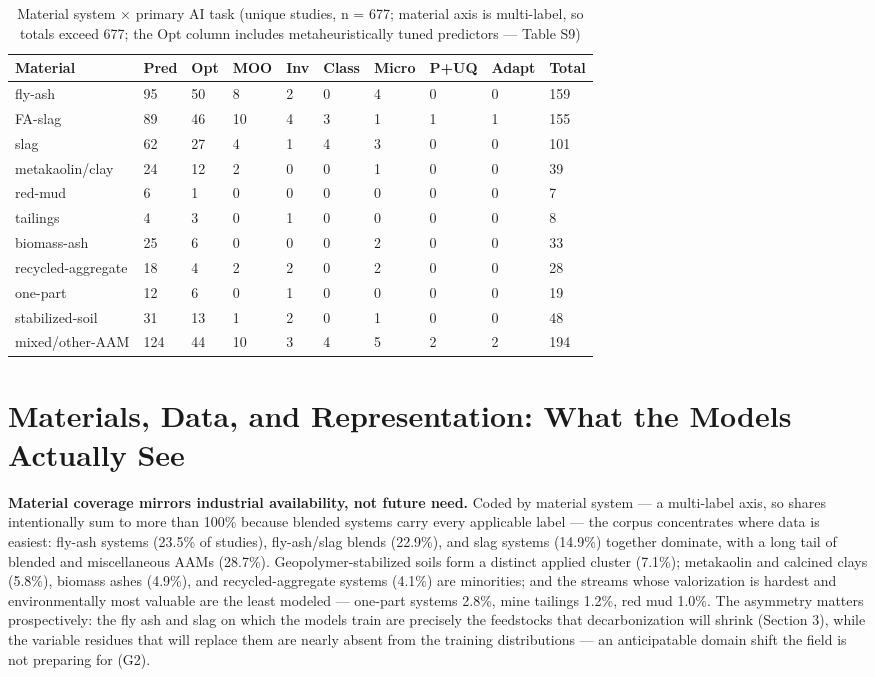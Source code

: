 \documentclass[pdflatex,sn-basic]{sn-jnl}
\begin{document}
\begin{table}[htbp]
\caption{Material system $\times$ primary AI task (unique studies, n = 677; material axis is multi-label, so totals exceed 677; the Opt column includes metaheuristically tuned predictors --- Table S9)}
\centering
{\footnotesize
\begin{tabular}{p{}lllllllll}
\toprule
Material & Pred & Opt & MOO & Inv & Class & Micro & P+UQ & Adapt & Total \\
\midrule
fly-ash & 95 & 50 & 8 & 2 & 0 & 4 & 0 & 0 & 159 \\
FA-slag & 89 & 46 & 10 & 4 & 3 & 1 & 1 & 1 & 155 \\
slag & 62 & 27 & 4 & 1 & 4 & 3 & 0 & 0 & 101 \\
metakaolin/clay & 24 & 12 & 2 & 0 & 0 & 1 & 0 & 0 & 39 \\
red-mud & 6 & 1 & 0 & 0 & 0 & 0 & 0 & 0 & 7 \\
tailings & 4 & 3 & 0 & 1 & 0 & 0 & 0 & 0 & 8 \\
biomass-ash & 25 & 6 & 0 & 0 & 0 & 2 & 0 & 0 & 33 \\
recycled-aggregate & 18 & 4 & 2 & 2 & 0 & 2 & 0 & 0 & 28 \\
one-part & 12 & 6 & 0 & 1 & 0 & 0 & 0 & 0 & 19 \\
stabilized-soil & 31 & 13 & 1 & 2 & 0 & 1 & 0 & 0 & 48 \\
mixed/other-AAM & 124 & 44 & 10 & 3 & 4 & 5 & 2 & 2 & 194 \\
\bottomrule
\end{tabular}}
\end{table}

\section{Materials, Data, and Representation: What the Models Actually See}

\textbf{Material coverage mirrors industrial availability, not future need.} Coded by material system --- a multi-label axis, so shares intentionally sum to more than 100\% because blended systems carry every applicable label --- the corpus concentrates where data is easiest: fly-ash systems (23.5\% of studies), fly-ash/slag blends (22.9\%), and slag systems (14.9\%) together dominate, with a long tail of blended and miscellaneous AAMs (28.7\%). Geopolymer-stabilized soils form a distinct applied cluster (7.1\%); metakaolin and calcined clays (5.8\%), biomass ashes (4.9\%), and recycled-aggregate systems (4.1\%) are minorities; and the streams whose valorization is hardest and environmentally most valuable are the least modeled --- one-part systems 2.8\%, mine tailings 1.2\%, red mud 1.0\%. The asymmetry matters prospectively: the fly ash and slag on which the models train are precisely the feedstocks that decarbonization will shrink (Section 3), while the variable residues that will replace them are nearly absent from the training distributions --- an anticipatable domain shift the field is not preparing for (G2).
\end{document}
